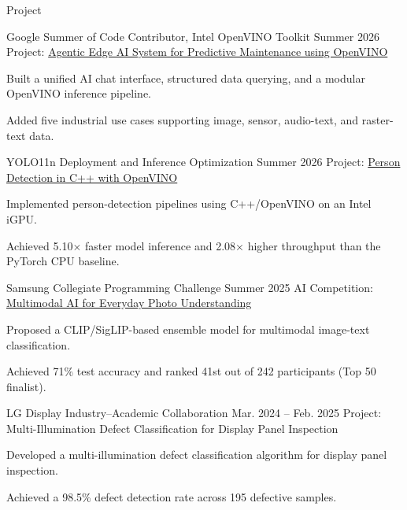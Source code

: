 \begin{rSection}{Project}
  \begin{rSubsection}
    {Google Summer of Code Contributor, Intel OpenVINO Toolkit}
    {Summer 2026}
    {Project: \href{https://github.com/johyeongseob/gsoc-2026}{Agentic Edge AI System for Predictive Maintenance using OpenVINO}}
    {}
    \item Built a unified AI chat interface, structured data querying, and a modular OpenVINO inference pipeline.
    \item Added five industrial use cases supporting image, sensor, audio-text, and raster-text data.
  \end{rSubsection}

  \begin{rSubsection}
    {YOLO11n Deployment and Inference Optimization}
    {Summer 2026}
    {Project: \href{https://github.com/johyeongseob/object-detection-python-cpp}{Person Detection in C++ with OpenVINO}}
    {}
    \item Implemented person-detection pipelines using C++/OpenVINO on an Intel iGPU.
    \item Achieved 5.10$\times$ faster model inference and 2.08$\times$ higher throughput than the PyTorch CPU baseline.
  \end{rSubsection}

  \begin{rSubsection}
    {Samsung Collegiate Programming Challenge}
    {Summer 2025}
    {AI Competition: \href{https://dacon.io/competitions/official/236500/overview/}{Multimodal AI for Everyday Photo Understanding}}
    {}
    \item Proposed a CLIP/SigLIP-based ensemble model for multimodal image-text classification.
    \item Achieved 71\% test accuracy and ranked 41st out of 242 participants (Top 50 finalist).
  \end{rSubsection}

  \begin{rSubsection}
    {LG Display Industry--Academic Collaboration}
    {Mar. 2024 -- Feb. 2025}
    {Project: Multi-Illumination Defect Classification for Display Panel Inspection}
    {}
    \item Developed a multi-illumination defect classification algorithm for display panel inspection.
    \item Achieved a 98.5\% defect detection rate across 195 defective samples.
  \end{rSubsection}


\end{rSection}

